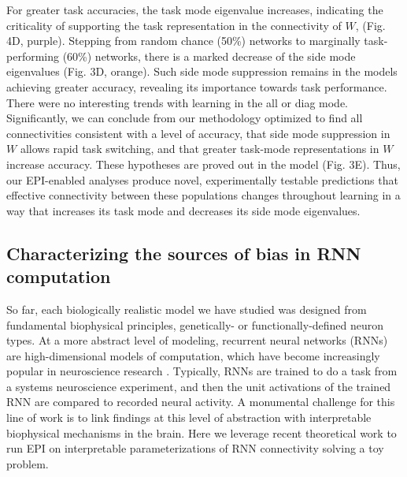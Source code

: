\documentclass[11pt]{article}
\begin{document}
For greater task accuracies, the task mode eigenvalue increases, indicating the criticality of supporting the task representation in the connectivity of $W$, (Fig. 4D, purple).  Stepping from random chance (50\%) networks to marginally task-performing (60\%) networks, there is a marked decrease of the side mode eigenvalues (Fig. 3D, orange).  Such side mode suppression remains in the models achieving greater accuracy, revealing its importance towards task performance.   There were no interesting trends with learning in the all or diag mode. Significantly, we can conclude from our methodology optimized to find all connectivities consistent with a level of accuracy, that side mode suppression in $W$ allows rapid task switching, and that greater task-mode representations in $W$ increase accuracy.  These hypotheses are proved out in the model (Fig. 3E).  Thus, our EPI-enabled analyses produce novel, experimentally testable predictions that effective connectivity between these populations changes throughout learning in a way that increases its task mode and decreases its side mode eigenvalues.

\subsection{Characterizing the sources of bias in RNN computation} \label{results_RNN}
So far, each biologically realistic model we have studied was designed from fundamental biophysical principles, genetically- or functionally-defined neuron types.  
At a more abstract level of modeling, recurrent neural networks (RNNs) are high-dimensional models of computation, which have become increasingly popular in neuroscience research \cite{barak2017recurrent}. 
Typically, RNNs are trained to do a task from a systems neuroscience experiment, and then the unit activations of the trained RNN are compared to recorded neural activity. 
A monumental challenge for this line of work is to link findings at this level of abstraction with interpretable biophysical mechanisms in the brain.  Here we leverage recent theoretical work to run EPI on interpretable parameterizations of RNN connectivity solving a toy problem.
 
\end{document}
